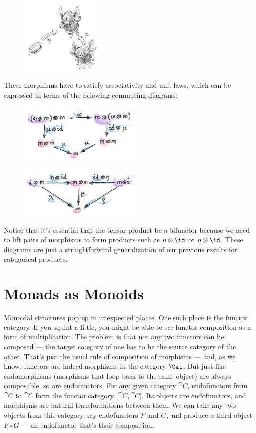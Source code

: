 \begin{figure}[H]
\centering
\includegraphics[width=40mm]{images/monoid-1.jpg}
\end{figure}

\noindent
These morphisms have to satisfy associativity and unit laws, which can
be expressed in terms of the following commuting diagrams:

\begin{figure}[H]
\centering
\includegraphics[width=60mm]{images/assoctensor.jpg}
\end{figure}

\begin{figure}[H]
\centering
\includegraphics[width=60mm]{images/unitmon.jpg}
\end{figure}

\noindent
Notice that it's essential that the tensor product be a bifunctor
because we need to lift pairs of morphisms to form products such as
$\mu \otimes \id$ or $\eta \otimes \id$. These diagrams are just a
straightforward generalization of our previous results for categorical
products.

\section{Monads as Monoids}

Monoidal structures pop up in unexpected places. One such place is the
functor category. If you squint a little, you might be able to see
functor composition as a form of multiplication. The problem is that not
any two functors can be composed --- the target category of one has to
be the source category of the other. That's just the usual rule of
composition of morphisms --- and, as we know, functors are indeed
morphisms in the category $\Cat$. But just like endomorphisms
(morphisms that loop back to the same object) are always composable, so
are endofunctors. For any given category $\cat{C}$, endofunctors from
$\cat{C}$ to $\cat{C}$ form the functor category ${[}\cat{C}, \cat{C}{]}$. Its
objects are endofunctors, and morphisms are natural transformations
between them. We can take any two objects from this category, say
endofunctors $F$ and $G$, and produce a third object $F \circ G$ ---
an endofunctor that's their composition.

